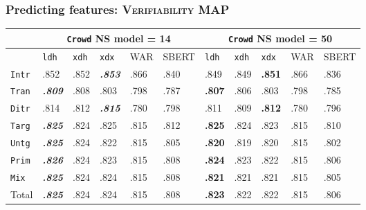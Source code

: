 \documentclass[handout,xcolor={dvipsnames}]{beamer}
\newcommand{\feat}[1]{\textsc{#1}}
\newcommand{\param}[1]{\texttt{#1}}
\begin{document}
\begin{frame}
\frametitle{Predicting features: \feat{Verifiability} MAP}

\small

\begin{table}[htb!]
\begin{center}
\setlength{\tabcolsep}{.35em}
\begin{tabular}{|l||l|l|l||l|l||l|l|l||l|l|}
\hline
 & \multicolumn{5}{c||}{\param{Crowd} NS model = 14} & \multicolumn{5}{c|}{\param{Crowd} NS model = 50} \\
\hline
    		& \param{ldh}	& \param{xdh} &	\param{xdx} & WAR	& {\scriptsize SBERT} & \param{ldh}	& \param{xdh} &	\param{xdx} & WAR	& {\scriptsize SBERT} \\ \hline
\hline
\param{Intr}  & .852                   & .852 & \textit{\textbf{.853}} & .866 & .840 & .849                   & .849          & \textbf{.851} & .866 & .836 \\
\hline
\param{Tran}  & \textit{\textbf{.809}} & .808 & .803                   & .798 & .787 & \textbf{.807}          & .806 & .803          & .798 & .785 \\
\hline
\param{Ditr}  & .814                   & .812 & \textit{\textbf{.815}} & .780 & .798 & .811                   & .809          & \textbf{.812} & .780 & .796 \\
\hline
\hline
\param{Targ}  & \textit{\textbf{.825}} & .824 & .825 & .815 & .812 & \textbf{.825} & .824          & .823          & .815 & .810 \\
\hline
\param{Untg}  & \textit{\textbf{.825}} & .824 & .822                   & .815 & .805 & \textbf{.820}          & .819          & .820 & .815 & .802 \\
\hline
\hline
\param{Prim}  & \textit{\textbf{.826}} & .824 & .823                   & .815 & .808 & \textbf{.824}          & .823          & .822          & .815 & .806 \\
\hline
\param{Mix}   & \textit{\textbf{.825}} & .824 & .824                   & .815 & .808 & \textbf{.821}          & .821 & .821 & .815 & .805 \\
\hline
\hline
Total & \textit{\textbf{.825}} & .824 & .824                   & .815 & .808 & \textbf{.823}          & .822          & .822          & .815 & .806 \\
\hline
\end{tabular}
\end{center}
\end{table}



\end{frame}
\end{document}
